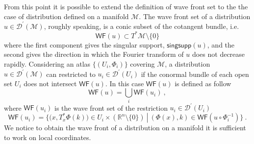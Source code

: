 \documentclass[11pt]{book}
\newcommand{\singsupp}{\mathsf{singsupp}}
\newcommand{\WF}{\mathsf{WF}}
\newcommand{\Dcal}{\mathcal{D}}
\newcommand{\Mcal}{\mathcal{M}}
\newcommand{\Rbb}{\mathbb{R}}
\theoremstyle{break}
\begin{document}
From this point it is possible to extend the definition of wave front set to the the case of distribution defined on a manifold $\Mcal$. The wave front set of a distribution $u \in \Dcal^\prime(\Mcal)$, roughly speaking, is a conic subset of the cotangent bundle, i.e.
%
\begin{equation}
\WF(u) \subset T^\ast\Mcal\setminus\{0\} 
\end{equation}
%
where the first component gives the singular support, $\singsupp(u)$, and the second gives the direction in which the Fourier transform of $u$ does not decrease rapidly. Considering an atlas $\{(U_i,\Phi_i)\}$ covering $\Mcal$, a distribution $u\in \Dcal^\prime(\Mcal)$ can restricted to $u_i \in \Dcal^\prime(U_i)$ if the conormal bundle of each open set $U_i$ does not intersect $\WF(u)$. In this case $\WF(u)$ is defined as follow 
%
\begin{equation*}
\WF(u) = \bigcup_i \WF(u_i) \ ,
\end{equation*}
%
where $\WF(u_i)$ is the wave front set of the restriction $u_i \in \Dcal^\prime(U_i)$
%
\begin{equation*}
\WF(u_i) = \bigg\{ \bigg( x, T_x^\ast\Phi(k) \bigg) \in U_i \times \left( \Rbb^n \setminus \{0\} \right) \ \left| \ \left( \Phi(x) , k \right) \in \WF\left( u \circ \Phi_i^{-1} \right) \bigg\} \ . \right.
\end{equation*}
%
We notice to obtain the wave front of a distribution on a manifold it is sufficient to work on local coordinates.


\bigskip
\end{document}
